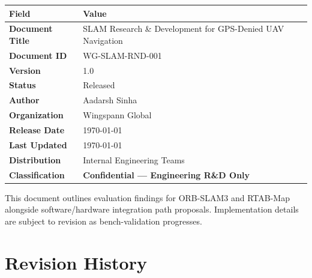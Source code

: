 \documentclass[11pt,a4paper]{article}
\begin{document}
\begin{table}[H]
    \renewcommand{\arraystretch}{1.5}
    \begin{tabularx}{\textwidth}{@{}lX@{}}
        \toprule
        \textbf{Field} & \textbf{Value} \\
        \midrule
        \textbf{Document Title} & SLAM Research \& Development for GPS-Denied UAV Navigation \\
        \textbf{Document ID}    & WG-SLAM-RND-001 \\
        \textbf{Version}        & 1.0 \\
        \textbf{Status}         & Released \\
        \midrule
        \textbf{Author}         & Aadarsh Sinha \\
        \textbf{Organization}   & Wingspann Global \\
        \midrule
        \textbf{Release Date}   & \today \\
        \textbf{Last Updated}   & \today \\
        \midrule
        \textbf{Distribution}   & Internal Engineering Teams \\
        \textbf{Classification} & \textcolor{alertred}{\textbf{Confidential --- Engineering R\&D Only}} \\
        \bottomrule
    \end{tabularx}
\end{table}

\vspace{1cm}

\begin{notebox}
    This document outlines evaluation findings for ORB-SLAM3 and RTAB-Map alongside software/hardware integration path proposals. Implementation details are subject to revision as bench-validation progresses.
\end{notebox}

\newpage
\section*{Revision History}
\end{document}
